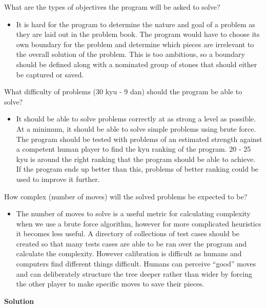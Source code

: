 \documentclass{l3proj}
\begin{document}
What are the types of objectives the program will be asked to solve?
\begin{itemize}
\item It is hard for the program to determine the nature and goal of a problem as they are laid out in the problem book.  The program would have to choose its own boundary for the problem and determine which pieces are irrelevant to the overall solution of the problem.  This is too ambitious, so a boundary should be defined along with a nominated group of stones that should either be captured or saved.
\end{itemize}
What difficulty of problems (30 kyu - 9 dan) should the program be able to solve?
\begin{itemize}
\item It should be able to solve problems correctly at as strong a level as possible.  At a minimum, it should be able to solve simple problems using brute force.  The program should be tested with problems of an estimated strength against a competent human player to find the kyu ranking of the program.  20 - 25 kyu is around the right ranking that the program should be able to achieve.  If the program ends up better than this, problems of better ranking could be used to improve it further.
\end{itemize}
How complex (number of moves) will the solved problems be expected to be?
\begin{itemize}
\item The number of moves to solve is a useful metric for calculating complexity when we use a brute force algorithm, however for more complicated heuristics it becomes less useful.  A directory of collections of test cases should be created so that many tests cases are able to be ran over the program and calculate the complexity.  However calibration is difficult as humans and computers find different things difficult.  Humans can perceive “good” moves and can deliberately structure the tree deeper rather than wider by forcing the other player to make specific moves to save their pieces.
\end{itemize}

\textbf{Solution}
\end{document}
